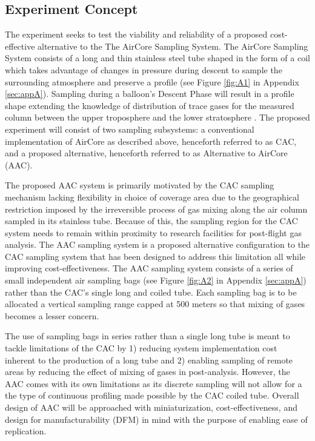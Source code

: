 \subsection{Experiment Concept}

The experiment seeks to test the viability and reliability of a proposed cost-effective alternative to the The AirCore Sampling System. The AirCore Sampling System consists of a long and thin stainless steel tube shaped in the form of a coil which takes advantage of changes in pressure during descent to sample the surrounding atmosphere and preserve a profile (see Figure \ref{fig:A1} in Appendix \ref{sec:appA}). Sampling during a balloon’s Descent Phase will result in a profile shape extending the knowledge of distribution of trace gases for the measured column between the upper troposphere and the lower stratosphere \cite{Karion}. The proposed experiment will consist of two sampling subsystems: a conventional implementation of AirCore as described above, henceforth referred to as CAC, and a proposed alternative, henceforth referred to as Alternative to AirCore (AAC).

The proposed AAC system is primarily motivated by the CAC sampling mechanism lacking flexibility in choice of coverage area due to the geographical restriction imposed by the irreversible process of gas mixing along the air column sampled in its stainless tube. Because of this, the sampling region for the CAC system needs to remain within proximity to research facilities for post-flight gas analysis. The AAC sampling system is a proposed alternative configuration to the CAC sampling system that has been designed to address this limitation all while improving cost-effectiveness. The AAC sampling system consists of a series of small independent air sampling bags (see Figure \ref{fig:A2} in Appendix \ref{sec:appA}) rather than the CAC's single long and coiled tube. Each sampling bag is to be allocated a vertical sampling range capped at 500 meters so that mixing of gases becomes a lesser concern.

The use of sampling bags in series rather than a single long tube is meant to tackle limitations of the CAC by 1) reducing system implementation cost inherent to the production of a long tube and 2) enabling sampling of remote areas by reducing the effect of mixing of gases in post-analysis. However, the AAC comes with its own limitations as its discrete sampling will not allow for a the type of continuous profiling made possible by the CAC coiled tube. Overall design of AAC will be approached with miniaturization, cost-effectiveness, and design for manufacturability (DFM) in mind with the purpose of enabling ease of replication.